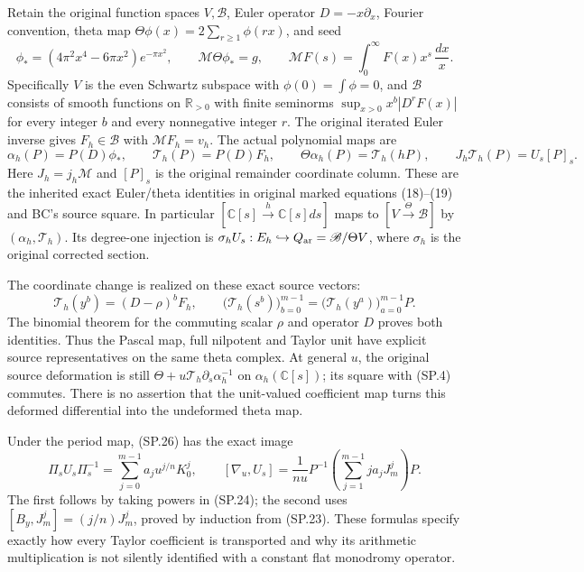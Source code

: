 Retain the original function spaces \(V,\mathscr B\), Euler
operator \(D=-x\partial_x\), Fourier convention, theta map
\(\Theta\phi(x)=2\sum_{r\ge1}\phi(rx)\), and seed
\[
 \phi_*=(4\pi^2x^4-6\pi x^2)e^{-\pi x^2},\qquad
 \mathcal M\Theta\phi_*=g,\qquad
 \mathcal MF(s)=\int_0^\infty F(x)x^s\,\frac{dx}{x}.
 \]
Specifically \(V\) is the even Schwartz subspace with
\(\phi(0)=\int\phi=0\), and \(\mathscr B\) consists of smooth
functions on \(\mathbb R_{>0}\) with finite seminorms
\(\sup_{x>0}x^b|D^rF(x)|\) for every integer \(b\) and
every nonnegative integer \(r\).
The original iterated Euler inverse gives \(F_h\in\mathscr B\)
with \(\mathcal MF_h=v_h\). The actual polynomial maps are
\[
 \alpha_h(P)=P(D)\phi_*,\qquad
 \mathcal T_h(P)=P(D)F_h,\qquad
 \Theta\alpha_h(P)=\mathcal T_h(hP),\qquad
 J_h\mathcal T_h(P)=U_s[P]_s .
 \tag{SP.27}\label{eq:sp-source}
\]
Here \(J_h=j_h\mathcal M\) and \([P]_s\) is the original
remainder coordinate column. These are the inherited exact
Euler/theta identities in original marked equations (18)--(19)
and BC's source square. In particular
\([\mathbb C[s]\xrightarrow{h}\mathbb C[s]ds]\)
maps to \([V\xrightarrow{\Theta}\mathscr B]\) by
\((\alpha_h,\mathcal T_h)\).
Its degree-one injection is \(\sigma_hU_s:E_h\hookrightarrow
Q_{\rm ar}=\mathscr B/\Theta V\), where
\(\sigma_h\) is the original corrected section.

The coordinate change is realized on these exact source vectors:
\[
 \mathcal T_h(y^b)=(D-\rho)^bF_h,\qquad
 \bigl(\mathcal T_h(s^b)\bigr)_{b=0}^{m-1}
 =\bigl(\mathcal T_h(y^a)\bigr)_{a=0}^{m-1}P.
 \tag{SP.28}\label{eq:sp-sourcetranslation}
\]
The binomial theorem for the commuting scalar \(\rho\) and
operator \(D\) proves both identities.
Thus the Pascal map, full nilpotent and Taylor unit have
explicit source representatives on the same theta complex.
At general \(u\), the original source deformation is still
\(\Theta+u\mathcal T_h\partial_s\alpha_h^{-1}\) on
\(\alpha_h(\mathbb C[s])\); its square with (SP.4) commutes.
There is no assertion that the unit-valued coefficient
map turns this deformed differential into the undeformed
theta map.

Under the period map, (SP.26) has the exact image
\[
 \Pi_s U_s\Pi_s^{-1}
 =\sum_{j=0}^{m-1}a_j u^{j/n}K_0^j,\qquad
 [\nabla_u,U_s]
 =\frac1{nu}P^{-1}
       \left(\sum_{j=1}^{m-1}j a_jJ_m^j\right)P.
 \tag{SP.29}\label{eq:sp-unittransport}
\]
The first follows by taking powers in (SP.24); the second
uses \([B_y,J_m^j]=(j/n)J_m^j\), proved by induction from
(SP.23). These formulas specify exactly how every Taylor
coefficient is transported and why its arithmetic
multiplication is not silently identified with a constant
flat monodromy operator.

